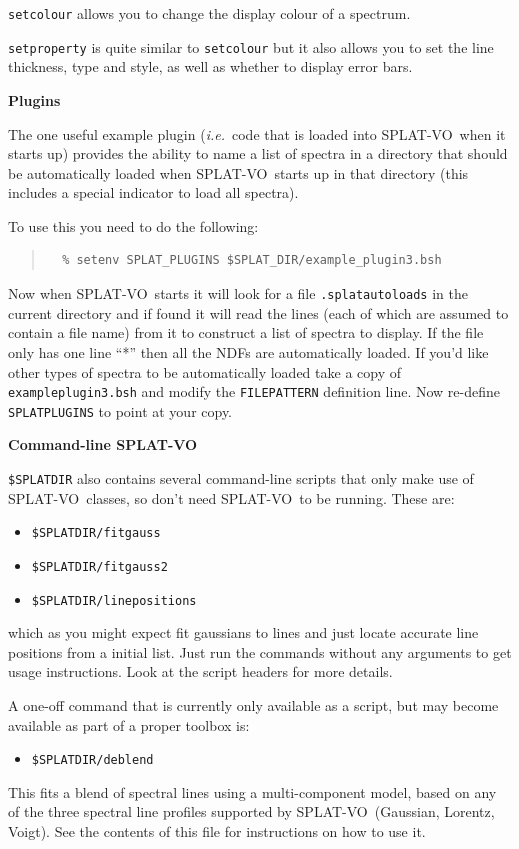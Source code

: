 \documentclass[twoside,11pt]{article}
\renewcommand{\_}{\texttt{\symbol{95}}}
\newcommand{\SPLAT}{\textsf{SPLAT-VO}}
\newcommand{\hitext}[1]{\texttt{#1}}
\newcommand{\ie}{\textit{i.e.}}
\newcommand{\subheading}[1]{\textbf{\large{#1}}}
\begin{document}
\hitext{setcolour} allows you to change the display colour of a spectrum.

\hitext{setproperty} is quite similar to \hitext{setcolour} but it
also allows you to set the line thickness, type and style, as well as
whether to display error bars.

\subheading{Plugins}

The one useful example plugin (\ie\ code that is loaded into \SPLAT\
when it starts up) provides the ability to name a list of spectra in a
directory that should be automatically loaded when \SPLAT\ starts up
in that directory (this includes a special indicator to load all
spectra).

To use this you need to do the following:
\begin{quote}
\begin{verbatim}
  % setenv SPLAT_PLUGINS $SPLAT_DIR/example_plugin3.bsh
\end{verbatim}
\end{quote}
Now when \SPLAT\ starts it will look for a file
\hitext{.splat\_autoloads}  in the current directory and if found
it will read the lines (each of which are
assumed to contain a file name) from it to construct a list of spectra
to display. If the file only has one line ``*'' then all the NDFs are
automatically loaded. If you'd like other types of spectra to be
automatically loaded take a copy of \hitext{example\_plugin3.bsh} and
modify the \hitext{FILE\_PATTERN} definition line. Now re-define
\hitext{SPLAT\_PLUGINS} to point at your copy.

\subheading{Command-line \SPLAT}

\hitext{\$SPLAT\_DIR} also contains several command-line scripts that
only make use of \SPLAT\ classes, so don't need \SPLAT\ to be running. These
are:
\begin{itemize}
\item \hitext{\$SPLAT\_DIR/fitgauss}
\item \hitext{\$SPLAT\_DIR/fitgauss2}
\item \hitext{\$SPLAT\_DIR/linepositions}
\end{itemize}
which as you might expect fit gaussians to lines and just locate
accurate line positions from a initial list. Just run the commands
without any arguments to get usage instructions. Look at the script
headers for more details.

A one-off command that is currently only available as a script, but may become
available as part of a proper toolbox is:
\begin{itemize}
\item \hitext{\$SPLAT\_DIR/deblend}
\end{itemize}
This fits a blend of spectral lines using a multi-component model, based on
any of the three spectral line profiles supported by \SPLAT\ (Gaussian,
Lorentz, Voigt). See the contents of this file for instructions on how to use
it.
\end{document}
